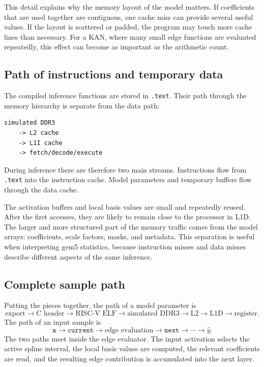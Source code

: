 \documentclass[11pt,a4paper]{article}
\begin{document}
This detail explains why the memory layout of the model matters.
If coefficients that are used together are contiguous, one cache miss can provide several useful values.
If the layout is scattered or padded, the program may touch more cache lines than necessary.
For a KAN, where many small edge functions are evaluated repeatedly, this effect can become as important as the arithmetic count.

\subsection{Path of instructions and temporary data}

The compiled inference functions are stored in \texttt{.text}.
Their path through the memory hierarchy is separate from the data path:
\begin{verbatim}
simulated DDR3
    -> L2 cache
    -> L1I cache
    -> fetch/decode/execute
\end{verbatim}
During inference there are therefore two main streams.
Instructions flow from \texttt{.text} into the instruction cache.
Model parameters and temporary buffers flow through the data cache.

The activation buffers and local basis values are small and repeatedly reused.
After the first accesses, they are likely to remain close to the processor in L1D.
The larger and more structured part of the memory traffic comes from the model arrays: coefficients, scale factors, masks, and metadata.
This separation is useful when interpreting gem5 statistics, because instruction misses and data misses describe different aspects of the same inference.

\subsection{Complete sample path}

Putting the pieces together, the path of a model parameter is
\begin{equation}
\text{export}
\rightarrow
\text{C header}
\rightarrow
\text{RISC-V ELF}
\rightarrow
\text{simulated DDR3}
\rightarrow
\text{L2}
\rightarrow
\text{L1D}
\rightarrow
\text{register}.
\end{equation}
The path of an input sample is
\begin{equation}
\bm{x}
\rightarrow
\texttt{current}
\rightarrow
\text{edge evaluation}
\rightarrow
\texttt{next}
\rightarrow
\cdots
\rightarrow
\hat{y}.
\end{equation}
The two paths meet inside the edge evaluator.
The input activation selects the active spline interval, the local basis values are computed, the relevant coefficients are read, and the resulting edge contribution is accumulated into the next layer.
\end{document}
